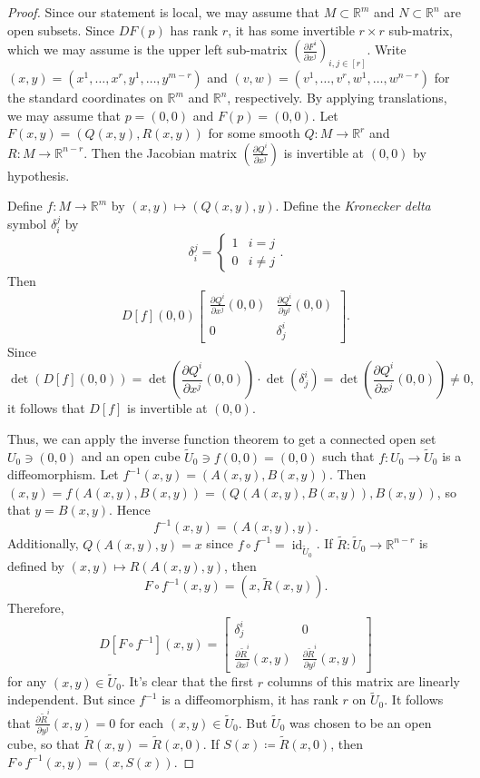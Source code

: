 \documentclass[10pt,letterpaper,cm]{nupset}
\theoremstyle{definition}
\theoremstyle{theorem}
\theoremstyle{remark}
\newcommand{\R}{\mathbb R}
\newcommand{\1}{\mathbf{1}}
\newcommand{\0}{\vec 0}
\DeclareMathOperator{\id}{id}
\begin{document}
\begin{proof}
Since our statement is local, we may assume that $M\subset \R^m$ and $N\subset \R^n$ are open subsets. Since $DF(p)$ has rank $r$, it has some invertible $r\times r$ sub-matrix, which we may assume is the upper left sub-matrix $\left(\frac{\partial{F^i}}{\partial{x^j}}\right)_{i,j\in [r]}$. Write $(x,y) = (x^1, \ldots, x^r, y^1, \ldots, y^{m-r})$ and $(v,w) = (v^1, \ldots, v^r, w^1, \ldots, w^{n-r})$ for the standard coordinates on $\R^m$ and $\R^n$, respectively. By applying translations, we may assume that $p=(0,0)$ and $F(p)= (0,0)$. Let $F(x,y)= (Q(x,y), R(x,y))$ for some smooth $Q: M \to \R^r$ and $R: M \to \R^{n-r}$. Then the Jacobian matrix $\left(\frac{\partial{Q^i}}{\partial{x^j}} \right)$ is invertible at $(0,0)$ by hypothesis. 

\medskip


Define $f : M \to \R^m$ by $(x,y) \mapsto (Q(x,y), y)$. Define the \textit{Kronecker delta} symbol $\delta_i^j$ by 
$$\delta_i^j = \begin{cases} 1 & i=j \\ 0 & i \ne j \end{cases}.$$  Then $$D[f](0,0) \begin{bmatrix} \frac{\partial{Q^i}}{\partial{x^j}}(0,0) & \frac{\partial{Q^i}}{\partial{y^j}}(0,0) \\ 0 & \delta^i_j     \end{bmatrix}   .$$ Since $$\det(D[f](0,0)) = \det \left( \frac{\partial{Q^i}}{\partial{x^j}}(0,0) \right) \cdot \det(\delta^i_j) = \det \left( \frac{\partial{Q^i}}{\partial{x^j}}(0,0)  \right) \ne 0,$$ it follows that $D[f]$ is invertible at $(0,0)$. 

\medskip

 Thus, we can apply the inverse function theorem to get a connected open set $U_0 \ni (0,0)$ and an open cube $\widetilde{U}_0 \ni f(0,0) = (0,0)$ such that $f: U_0 \to \widetilde{U}_0$ is a diffeomorphism.  Let $f^{-1}(x,y) =(A(x,y), B(x,y))$. Then $(x,y) = f(A(x,y), B(x,y)) = (Q(A(x,y), B(x,y)), B(x,y))$, so that $y = B(x,y)$. Hence $$f^{-1}(x,y) = (A(x,y), y).$$ Additionally, $Q(A(x,y), y)=x$ since $f\circ f^{-1} = \id_{\widetilde{U}_0}$. If $\widetilde{R} : \widetilde{U}_0 \to \R^{n-r}$ is defined by $(x,y) \mapsto R(A(x,y), y)$, then $$F\circ f^{-1}(x,y) = (x, \widetilde{R}(x,y)).$$ Therefore, $$D[F\circ f^{-1}](x,y)  =  \begin{bmatrix}    \delta^i_j & 0 \\ 
\frac{\partial{\widetilde{R}^i}}{\partial{x^j}}(x,y) & \frac{\partial{\widetilde{R}^i}}{\partial{y^j}}(x,y)    \end{bmatrix} $$ for any $(x,y) \in \widetilde{U}_0$. It's clear that the first $r$ columns of this matrix are linearly independent. But since $f^{-1}$ is a diffeomorphism, it has rank $r$ on $\widetilde{U}_0$. It follows that $ \frac{\partial{\widetilde{R}^i}}{\partial{y^j}}(x,y) =0$ for each $(x,y) \in \widetilde{U}_0$. But $\widetilde{U}_0$ was chosen to be an open cube, so that $\widetilde{R}(x,y) = \widetilde{R}(x,0)$. If $S(x) \coloneqq \widetilde{R}(x,0)$, then $F \circ f^{-1}(x,y) = (x, S(x))$. 


\end{proof}
\end{document}
